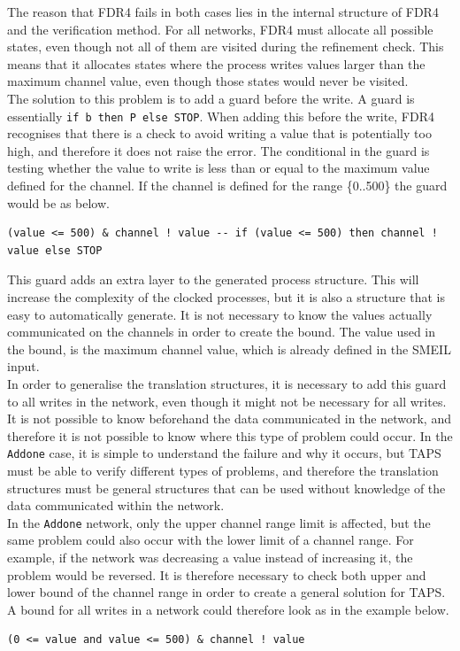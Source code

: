 The reason that FDR4 fails in both cases lies in the internal structure of FDR4 and the verification method. For all networks, FDR4 must allocate all possible states, even though not all of them are visited during the refinement check. This means that it allocates states where the process writes values larger than the maximum channel value, even though those states would never be visited.\\

The solution to this problem is to add a guard before the write. A \cspm{} guard is essentially \texttt{if b then P else STOP}. When adding this before the write, FDR4 recognises that there is a check to avoid writing a value that is potentially too high, and therefore it does not raise the error. The conditional in the guard is testing whether the value to write is less than or equal to the maximum value defined for the channel. If the channel is defined for the range \{0..500\} the guard would be as below.
\begin{verbatim}
(value <= 500) & channel ! value -- if (value <= 500) then channel ! value else STOP
\end{verbatim}

This guard adds an extra layer to the generated process structure. This will increase the complexity of the clocked processes, but it is also a structure that is easy to automatically generate. It is not necessary to know the values actually communicated on the channels in order to create the bound. The value used in the bound, is the maximum channel value, which is already defined in the SMEIL input. \\

In order to generalise the translation structures, it is necessary to add this guard to all writes in the network, even though it might not be necessary for all writes. It is not possible to know beforehand the data communicated in the network, and therefore it is not possible to know where this type of problem could occur. In the \texttt{Addone} case, it is simple to understand the failure and why it occurs, but TAPS must be able to verify different types of problems, and therefore the translation structures must be general structures that can be used without knowledge of the data communicated within the network. \\

In the \texttt{Addone} network, only the upper channel range limit is affected, but the same problem could also occur with the lower limit of a channel range. For example, if the network was decreasing a value instead of increasing it, the problem would be reversed. It is therefore necessary to check both upper and lower bound of the channel range in order to create a general solution for TAPS. A bound for all writes in a network could therefore look as in the example below.
\begin{verbatim}
(0 <= value and value <= 500) & channel ! value
\end{verbatim}
